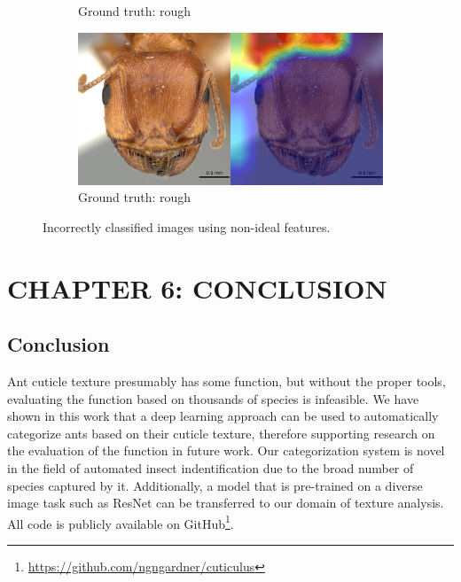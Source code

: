 \documentclass[12pt]{article}
\begin{document}
\begin{figure}
\begin{subfigure}{\subwidth}
        \caption{Ground truth: rough}
        \label{fig:incorrect_nonideal_61}
    \end{subfigure}
    \begin{subfigure}{\subwidth}
        \includegraphics[width=1\linewidth]{assets/gradcam/incorrect_nonideal/204.png}
        \caption{Ground truth: rough}
        \label{fig:incorrect_nonideal_204}
    \end{subfigure}
    \caption{Incorrectly classified images using non-ideal features.}
    \label{fig:incorrect_nonideal}
\end{figure}

\clearpage
\section{CHAPTER 6: CONCLUSION}

\subsection{Conclusion}
Ant cuticle texture presumably has some function, but without the proper tools,
evaluating the function based on thousands of species is infeasible. We have
shown in this work that a deep learning approach can be used to automatically
categorize ants based on their cuticle texture, therefore supporting research on
the evaluation of the function in future work. Our categorization system is
novel in the field of automated insect indentification due to the broad number
of species captured by it. Additionally, a model that is pre-trained on a
diverse image task such as ResNet can be transferred to our domain of texture
analysis. All code is publicly available on
GitHub\footnote{\href{https://github.com/ngngardner/cuticulus}
    {https://github.com/ngngardner/cuticulus}}.
\end{document}
